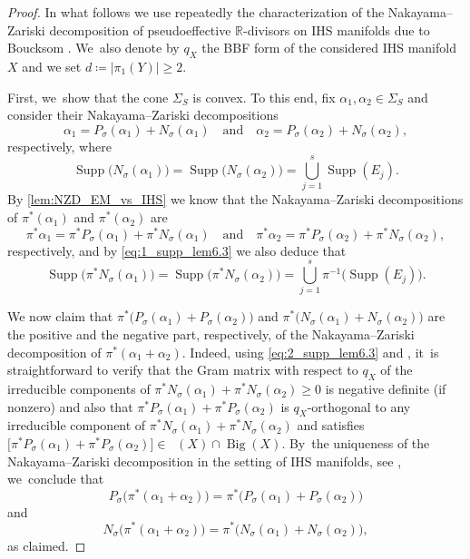 \documentclass[10pt]{amsart}
\theoremstyle{plain}
\theoremstyle{definition}
\newcommand{\R}{\mathbb{R}}
\DeclareMathOperator{\Supp}{Supp}
\DeclareMathOperator{\Movb}{\overline{\mathrm{Mov}}}
\DeclareMathOperator{\BgCn}{\mathrm{Big}}
\begin{document}
\begin{proof}
In what follows we use repeatedly the characterization of the Nakayama--Zariski decomposition of pseudoeffective $\R$\nobreakdash-divisors on IHS manifolds due to Boucksom \cite[Th.\,4.8]{Boucksom04}. We~also denote by $q_X$ the BBF form of the considered IHS manifold $X$ and we set $d \coloneqq | \pi_1(Y) | \geq 2$.

First, we~show that the cone $\Sigma_S$ is convex. To this end, fix $\alpha_1, \alpha_2 \in \Sigma_S$ and consider their Nakayama--Zariski decompositions
\[
\alpha_1 = P_\sigma(\alpha_1) + N_\sigma(\alpha_1) \quad \text{and} \quad \alpha_2 = P_\sigma(\alpha_2) + N_\sigma(\alpha_2),
\]
respectively, where
\begin{equation}
\label{eq:1_supp_lem6.3}
\Supp \bigl(N_{\sigma}(\alpha_1) \bigr) = \Supp \bigl(N_{\sigma}(\alpha_2) \bigr) = \bigcup_{j=1}^s \Supp(E_j).
\end{equation}
By \autoref{lem:NZD_EM_vs_IHS} we know that the Nakayama--Zariski decompositions of $\pi^* (\alpha_1)$ and $\pi^* (\alpha_2)$ are
\[
\pi^* \alpha_1 = \pi^* P_\sigma(\alpha_1) + \pi^* N_\sigma(\alpha_1) \quad \text{and} \quad \pi^* \alpha_2 = \pi^* P_\sigma(\alpha_2) + \pi^* N_\sigma(\alpha_2),
\]
respectively, and by \eqref{eq:1_supp_lem6.3} we also deduce that
\begin{equation}
\label{eq:2_supp_lem6.3}
\Supp \bigl(\pi^* N_{\sigma} (\alpha_1) \bigr) = \Supp \bigl(\pi^* N_{\sigma} (\alpha_2) \bigr) = \bigcup_{j=1}^s \pi^{-1} \bigl(\Supp (E_j) \bigr).
\end{equation}

We now claim that $\pi^* \bigl(P_\sigma(\alpha_1) + P_\sigma(\alpha_2) \bigr)$ and $\pi^* \bigl(N_\sigma(\alpha_1) + N_\sigma(\alpha_2) \bigr)$ are the positive and the negative part, respectively, of the Nakayama--Zariski decomposition of $\pi^*(\alpha_1 + \alpha_2)$. Indeed, using \eqref{eq:2_supp_lem6.3} and \cite[Th.\,4.8]{Boucksom04}, it~is straightforward to verify that the Gram matrix with respect to $q_X$ of the irreducible components of $\pi^*N_\sigma(\alpha_1)+\pi^*N_\sigma(\alpha_2) \geq 0$ is negative definite (if nonzero) and also that $\pi^* P_\sigma(\alpha_1)+\pi^* P_\sigma(\alpha_2)$ is $q_X$-orthogonal to any irreducible component of $\pi^* N_\sigma(\alpha_1)+\pi^*N_\sigma(\alpha_2)$ and satisfies
$\big[\pi^* P_\sigma(\alpha_1)+\pi^* P_\sigma(\alpha_2) \big] \in \Movb(X) \cap \BgCn(X)$. By~the uniqueness of the Nakayama--Zariski decomposition in the setting of IHS manifolds, see \cite[Th.\,4.8]{Boucksom04}, we~conclude that
\begin{equation*}
P_\sigma \bigl(\pi^* (\alpha_1 + \alpha_2) \bigr) = \pi^* \bigl(P_\sigma(\alpha_1) + P_\sigma(\alpha_2) \bigr)
\end{equation*}
and
\begin{equation}
\label{eq:3_Nsigma_lem6.3}
N_\sigma \bigl(\pi^* (\alpha_1 + \alpha_2) \bigr) = \pi^* \bigl(N_\sigma(\alpha_1) + N_\sigma(\alpha_2) \bigr),
\end{equation}
as claimed.


\end{proof}
\end{document}
